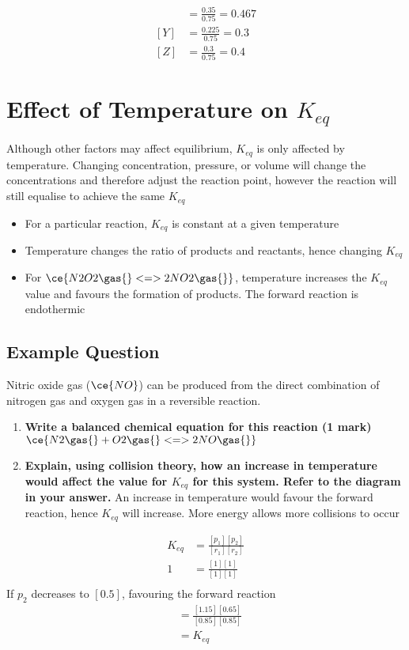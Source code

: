 	\begin{align*}
		[X] &= \frac{0.35}{0.75} = 0.467 \\
		[Y] &= \frac{0.225}{0.75} = 0.3 \\
		[Z] &= \frac{0.3}{0.75} = 0.4
	\end{align*}
	
\section{Effect of Temperature on $K_{eq}$} \label{8/11/2024}
	Although other factors may affect equilibrium, $K_{eq}$ is only affected by temperature.
	Changing concentration, pressure, or volume will change the concentrations and therefore adjust the reaction point, however the reaction will still equalise to achieve the same $K_{eq}$

	\begin{itemize}
		\item For a particular reaction, $K_{eq}$ is constant at a given temperature
		\item Temperature changes the ratio of products and reactants, hence changing $K_{eq}$
		\item For $\ce{N2O2 \gas{} <=> 2NO2 \gas{}}$, temperature increases the $K_{eq}$ value and favours the formation of products. The forward reaction is endothermic
	\end{itemize}

	\subsection{Example Question}
		Nitric oxide gas ($\ce{NO}$) can be produced from the direct combination of nitrogen gas and oxygen gas in a reversible reaction.
		\begin{enumerate}
			\item \textbf{Write a balanced chemical equation for this reaction (1 mark)}
				\subitem $\ce{N2 \gas{} + O2 \gas{} <=> 2NO \gas{}}$
			\item \textbf{Explain, using collision theory, how an increase in temperature would affect the value for $K_{eq}$ for this system. Refer to the diagram in your answer.}
				\subitem An increase in temperature would favour the forward reaction, hence $K_{eq}$ will increase. More energy allows more collisions to occur
		\end{enumerate}
	
		\begin{align*}
			K_{eq} &= \frac{[p_1][p_2]}{[r_1][r_2]} \\
			1 &= \frac{[1][1]}{[1][1]} \\
		\end{align*}
		\centering If $p_2$ decreases to $[0.5]$, favouring the forward reaction
		\begin{align*}
			&= \frac{[1.15][0.65]}{[0.85][0.85]} \\
			&=K_{eq}
		\end{align*}